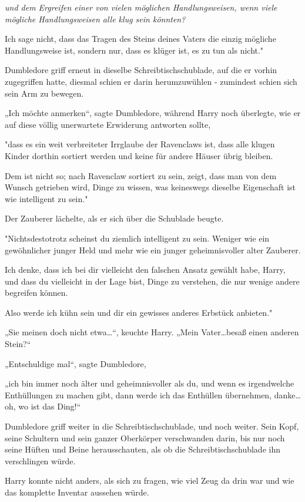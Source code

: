 {\emph{und dem Ergreifen einer von vielen möglichen Handlungsweisen, wenn viele mögliche Handlungsweisen alle klug sein könnten?}

Ich sage nicht, dass das Tragen des Steins deines Vaters die einzig mögliche Handlungsweise ist, sondern nur, dass es klüger ist, es zu tun als nicht."

Dumbledore griff erneut in dieselbe Schreibtischschublade, auf die er vorhin zugegriffen hatte, diesmal schien er darin herumzuwühlen - zumindest schien sich sein Arm zu bewegen.

„Ich möchte anmerken“, sagte Dumbledore, während Harry noch überlegte, wie er auf diese völlig unerwartete Erwiderung antworten sollte,

"dass es ein weit verbreiteter Irrglaube der Ravenclaws ist, dass alle klugen Kinder dorthin sortiert werden und keine für andere Häuser übrig bleiben.

Dem ist nicht so; nach Ravenclaw sortiert zu sein, zeigt, dass man von dem Wunsch getrieben wird, Dinge zu wissen, was keineswegs dieselbe Eigenschaft ist wie intelligent zu sein."

Der Zauberer lächelte, als er sich über die Schublade beugte.

"Nichtsdestotrotz scheinst du ziemlich intelligent zu sein. Weniger wie ein gewöhnlicher junger Held und mehr wie ein junger geheimnisvoller alter Zauberer.

Ich denke, dass ich bei dir vielleicht den falschen Ansatz gewählt habe, Harry, und dass du vielleicht in der Lage bist, Dinge zu verstehen, die nur wenige andere begreifen können.

Also werde ich kühn sein und dir ein gewisses anderes Erbstück anbieten."

„Sie meinen doch nicht etwa…“, keuchte Harry. „Mein Vater…besaß einen anderen Stein?“

„Entschuldige mal“, sagte Dumbledore,

„ich bin immer noch älter und geheimnisvoller als du, und wenn es irgendwelche Enthüllungen zu machen gibt, dann werde ich das Enthüllen übernehmen, danke…oh, wo ist das Ding!“

Dumbledore griff weiter in die Schreibtischschublade, und noch weiter. Sein Kopf, seine Schultern und sein ganzer Oberkörper verschwanden darin, bis nur noch seine Hüften und Beine herausschauten, als ob die Schreibtischschublade ihn verschlingen würde.

Harry konnte nicht anders, als sich zu fragen, wie viel Zeug da drin war und wie das komplette Inventar aussehen würde.

}
